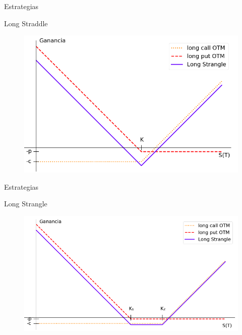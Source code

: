 \documentclass{beamer}
\begin{document}
\begin{frame}{Estrategias}

    \begin{block}{Long Straddle}

        \begin{figure}
            \includegraphics[scale=0.45]{straddle}
        \end{figure}

    \end{block}

\end{frame}

\begin{frame}{Estrategias}

    \begin{block}{Long Strangle}

        \begin{figure}
            \includegraphics[scale=0.37]{strangle}
        \end{figure}

    \end{block}

\end{frame}
\end{document}
